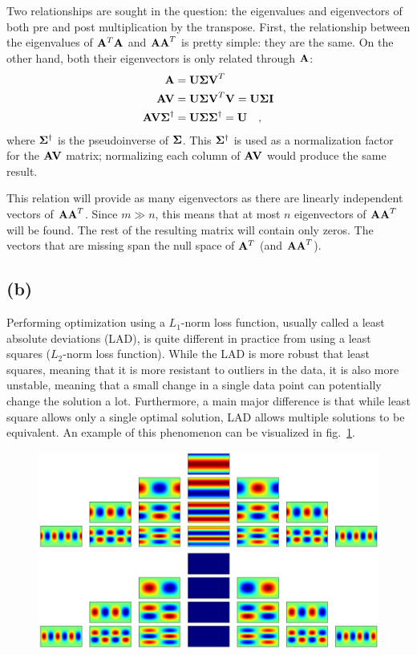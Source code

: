 \documentclass{report}
\begin{document}
Two relationships are sought in the question: the eigenvalues and eigenvectors of both pre and post multiplication by the transpose. First, the relationship between the eigenvalues of $\mathbf{A}^T\mathbf{A}$ and $\mathbf{AA}^T$ is pretty simple: they are the same. On the other hand, both their eigenvectors is only related through $\mathbf{A}$:
\begin{align*}
\mathbf{A}  &= \mathbf{U \Sigma V}^T \\
\mathbf{AV} &= \mathbf{U \Sigma V}^T \mathbf{V} = \mathbf{U \Sigma I} \\
\mathbf{AV\Sigma}^\dagger &= \mathbf{U \Sigma \Sigma}^\dagger = \mathbf{U} \quad,
\end{align*}
where $\mathbf{\Sigma}^\dagger$ is the pseudoinverse of $\mathbf{\Sigma}$. This $\mathbf{\Sigma}^\dagger$ is used as a normalization factor for the $\mathbf{AV}$ matrix; normalizing each column of $\mathbf{AV}$ would produce the same result.

This relation will provide as many eigenvectors as there are linearly independent vectors of $\mathbf{AA}^T$. Since $m \gg n$, this means that at most $n$ eigenvectors of $\mathbf{AA}^T$ will be found. The rest of the resulting matrix will contain only zeros. The vectors that are missing span the null space of $\mathbf{A}^T$ (and $\mathbf{AA}^T$).

\subsection{(b)}

Performing optimization using a $L_1$-norm loss function, usually called a least absolute deviations (LAD), is quite different in practice from using a least squares ($L_2$-norm loss function). While the LAD is more robust that least squares, meaning that it is more resistant to outliers in the data, it is also more unstable, meaning that a small change in a single data point can potentially change the solution a lot. Furthermore, a main major difference is that while least square allows only a single optimal solution, LAD allows multiple solutions to be equivalent. An example of this phenomenon can be visualized in fig.~\ref{q5c:paths}.

\begin{figure}
  \centering
  \includegraphics[width=0.45\linewidth]{q8_a_pyramid_real.png}
  \includegraphics[width=0.45\linewidth]{q8_a_pyramid_imag.png}
  \caption[ Description ]
   \label{q5c:paths}
\end{figure}
\end{document}
